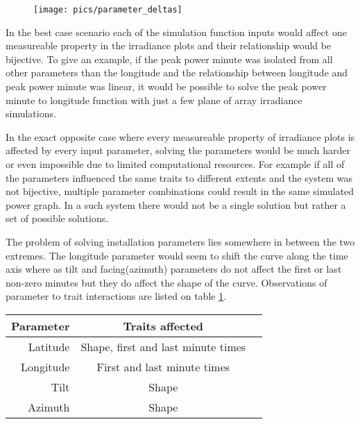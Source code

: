 

\begin{figure}[ht!]
\centering
\texttt{[image: pics/parameter\_deltas]}
\label{fig_poa_different_parameters}
\end{figure}

\noindent In the best case scenario each of the simulation function inputs would affect one measureable property in the irradiance plots and their relationship would be bijective. To give an example, if the peak power minute was isolated from all other parameters than the longitude and the relationship between longitude and peak power minute was linear, it would be possible to solve the peak power minute to longitude function with just a few plane of array irradiance simulations.

In the exact opposite case where every measureable property of irradiance plots is affected by every input parameter, solving the parameters would be much harder or even impossible due to limited computational resources. For example if all of the parameters influenced the same traits to different extents and the system was not bijective, multiple parameter combinations could result in the same simulated power graph. In a such system there would not be a single solution but rather a set of possible solutions.

The problem of solving installation parameters lies somewhere in between the two extremes. The longitude parameter would seem to shift the curve along the time axis where as tilt and facing(azimuth) parameters do not affect the first or last non-zero minutes but they do affect the shape of the curve. Observations of parameter to trait interactions are listed on table \ref{table_traits}.



\begin{table}[H]
\centering
\begin{tabular}{r|cc} \hline\hline

 Parameter & Traits affected\\ \hline
 Latitude & Shape, first and last minute times\\
 Longitude & First and last minute times\\
 Tilt & Shape\\
 Azimuth & Shape\\

\hline\hline
\end{tabular}
\label{table_traits}
\end{table}


